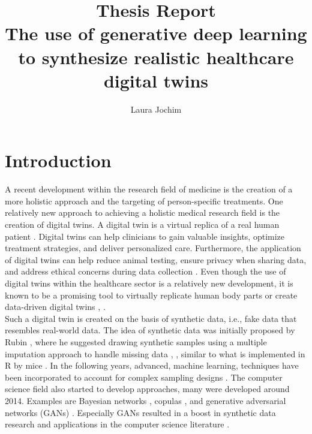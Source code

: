 \documentclass[review,12pt]{elsarticle}
\begin{document}
\title {Thesis Report \\[1ex] \large The use of generative deep learning to synthesize realistic healthcare digital twins}
\author {Laura Jochim}


\maketitle


\section{ Introduction}
A recent development within the research field of medicine is the creation of a more holistic approach and the targeting of person-specific treatments. One relatively new approach to achieving a holistic medical research field is the creation of digital twins. A digital twin is a virtual replica of a real human patient \cite{jpm13101522}. Digital twins can help clinicians to gain valuable insights, optimize treatment strategies, and deliver personalized care. Furthermore, the application of digital twins can help reduce animal testing, ensure privacy when sharing data, and address ethical concerns during data collection \cite{Subramanian2020DigitalTF}. Even though the use of digital twins within the healthcare sector is a relatively new development, it is known to be a promising tool to virtually replicate human body parts or create data-driven digital twins \cite{GILLETTE2021102080}, \cite{KOVATCHEV2019432}. \\
Such a digital twin is created on the basis of synthetic data, i.e., fake data that resembles real-world data. The idea of synthetic data was initially proposed by Rubin \cite{scb2023disclosure}, where he suggested drawing synthetic samples using a multiple imputation approach to handle missing data \cite{MR742974}, \cite{Rubin2002MULTIPLEII}, similar to what is implemented in R by mice \cite{mice}. In the following years, advanced, machine learning, techniques have been incorporated to account for complex sampling designs \cite{10.1214/24-STS927}. The computer science field also started to develop approaches, many were developed around 2014. Examples are Bayesian networks \cite{bayesian_network}, copulas \cite{article}, and generative adversarial networks (GANs) \cite{goodfellow2014generativeadversarialnetworks}. Especially GANs resulted in a boost in synthetic data research and applications in the computer science literature \cite{10.1214/24-STS927}. 
\\
\end{document}
